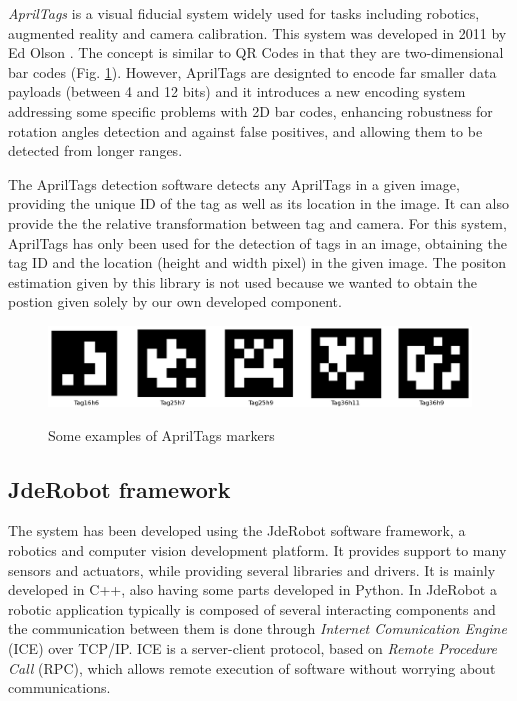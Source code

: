 \documentclass{styles/svproc}
\begin{document}
	\textit{AprilTags} is a visual fiducial system widely used for tasks including robotics, augmented reality and camera calibration. This system was developed in 2011 by Ed Olson \cite{eolson}. The concept is similar to QR Codes in that they are two-dimensional bar codes (Fig. \ref{fig:apriltags}). However, AprilTags are designted to encode far smaller data payloads (between 4 and 12 bits) and it introduces a new encoding system addressing some specific problems with 2D bar codes, enhancing robustness for rotation angles detection and against false positives, and allowing them to be detected from longer ranges.
	
	The AprilTags detection software detects any AprilTags in a given image, providing the unique ID of the tag as well as its location in the image. It can also provide the the relative transformation between tag and camera. For this system, AprilTags has only been used for the detection of tags in an image, obtaining the tag ID and the location (height and width pixel) in the given image. The positon estimation given by this library is not used because we wanted to obtain the postion given solely by our own developed component.
	
	\begin{figure}[h]
		\begin{center}
		{\includegraphics[width=\linewidth]{ejemplosapriltags.png}}
		\end{center}
		\caption{Some examples of AprilTags markers}
		\label{fig:apriltags}
	\end{figure}
	
\subsection{JdeRobot framework}

	The system has been developed using the JdeRobot software framework, a robotics and computer vision development platform. It provides support to many sensors and actuators, while providing several libraries and drivers. It is mainly developed in C++, also having some parts developed in Python. In JdeRobot a robotic application typically is composed of several interacting components and the communication between them is done through \textit{Internet Comunication Engine} (ICE) over TCP/IP. ICE is a server-client protocol, based on \textit{Remote Procedure Call} (RPC), which allows remote execution of software without worrying about communications.
\end{document}

